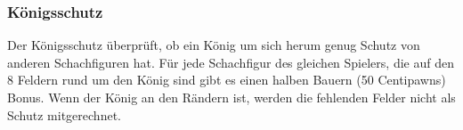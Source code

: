 \subsubsection{Königsschutz}
Der Königsschutz überprüft, ob ein König um sich herum genug Schutz von anderen Schachfiguren hat.\newline
F\"ur jede Schachfigur des gleichen Spielers, die auf den 8 Feldern rund um den K\"onig sind gibt es einen halben Bauern (50 Centipawns) Bonus. Wenn der K\"onig an den R\"andern ist, werden die fehlenden Felder nicht als Schutz mitgerechnet.
